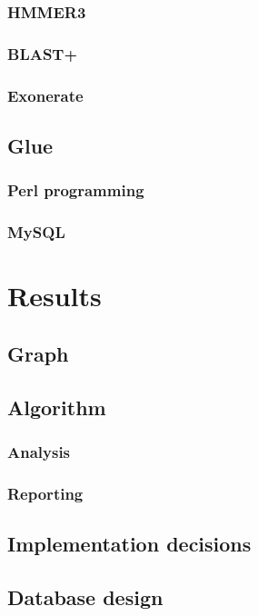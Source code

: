 \documentclass[a4paper,12.5pt]{scrreprt}
\begin{document}
		\subsection{HMMER3}
			
		\subsection{BLAST+}
			
		\subsection{Exonerate}
			
	\section{Glue}
		\subsection{Perl programming}
			
		\subsection{MySQL}
			

\chapter{Results}
	\section{Graph}
		
	\section{Algorithm}
		\subsection{Analysis}
			
		\subsection{Reporting}
			
	\section{Implementation decisions}
		
	\section{Database design}
		
\end{document}
